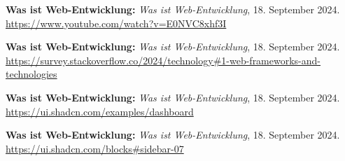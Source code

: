 \begin{literature}
\textbf{Was ist Web-Entwicklung:} \textit{Was ist Web-Entwicklung}, 18. September 2024. \url{https://www.youtube.com/watch?v=E0NVC8xhf3I}

\textbf{Was ist Web-Entwicklung:} \textit{Was ist Web-Entwicklung}, 18. September 2024. \url{https://survey.stackoverflow.co/2024/technology#1-web-frameworks-and-technologies}

\textbf{Was ist Web-Entwicklung:} \textit{Was ist Web-Entwicklung}, 18. September 2024. \url{https://ui.shadcn.com/examples/dashboard}

\textbf{Was ist Web-Entwicklung:} \textit{Was ist Web-Entwicklung}, 18. September 2024. \url{https://ui.shadcn.com/blocks#sidebar-07}









\end{literature}
